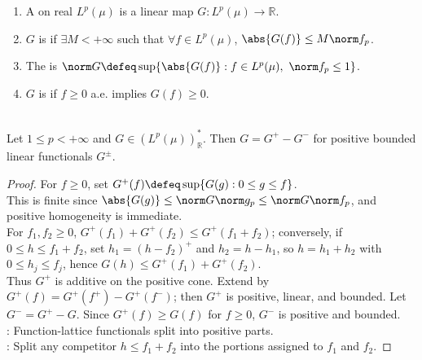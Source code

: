 \begin{definition} \label{def:bounded-linear-functional-on-lp} 
\begin{enumerate}[label=(\roman*)]
\setlength{\itemsep}{0pt}
\item A  on real $L^p(\mu)$ is a linear map $G:L^p(\mu)\to\mathbb R$.
\item $G$ is  if $\exists M<+\infty$ such that $\forall f\in L^p(\mu)$, $\abs{G(f)}\leq M\norm f_p$.
\item The  is $\norm G\defeq\sup\{\abs{G(f)}:f\in L^p(\mu),\ \norm f_p\leq1\}$.
\item $G$ is  if $f\geq0$ a.e. implies $G(f)\geq0$.
\end{enumerate}
\end{definition}

\begin{lemma} \label{lem:bounded-lp-functional-positive-split} \\
Let $1\leq p<+\infty$ and $G\in(L^p(\mu))^*_\mathbb R$. Then $G=G^+-G^-$ for positive bounded linear functionals $G^\pm$.
\begin{proof}
For $f\geq0$, set $G^+(f)\defeq\sup\{G(g):0\leq g\leq f\}$.\\
This is finite since $\abs{G(g)}\leq\norm G\norm g_p\leq\norm G\norm f_p$, and positive homogeneity is immediate.\\
For $f_1,f_2\geq0$, $G^+(f_1)+G^+(f_2)\leq G^+(f_1+f_2)$; conversely, if $0\leq h\leq f_1+f_2$, set $h_1=(h-f_2)^+$ and $h_2=h-h_1$, so $h=h_1+h_2$ with $0\leq h_j\leq f_j$, hence $G(h)\leq G^+(f_1)+G^+(f_2)$.\\
Thus $G^+$ is additive on the positive cone. Extend by $G^+(f)=G^+(f^+)-G^+(f^-)$; then $G^+$ is positive, linear, and bounded. Let $G^-=G^+-G$. Since $G^+(f)\geq G(f)$ for $f\geq0$, $G^-$ is positive and bounded.\\
: Function-lattice functionals split into positive parts.\\
: Split any competitor $h\leq f_1+f_2$ into the portions assigned to $f_1$ and $f_2$.
\end{proof}
\end{lemma}

